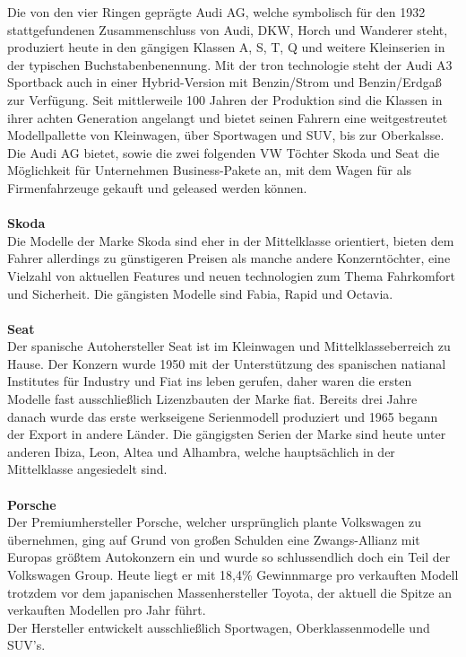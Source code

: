 \documentclass[12pt]{article}
\begin{document}
Die von den vier Ringen geprägte Audi AG, welche symbolisch für den 1932 stattgefundenen Zusammenschluss von
Audi, DKW, Horch und Wanderer steht, produziert heute in den gängigen Klassen A, S, T, Q und weitere Kleinserien in der typischen Buchstabenbenennung. Mit der tron technologie steht der Audi A3 Sportback auch in einer Hybrid-Version mit Benzin/Strom und Benzin/Erdgaß zur Verfügung.
Seit mittlerweile 100 Jahren der Produktion sind die Klassen in ihrer achten Generation angelangt und bietet seinen Fahrern eine weitgestreutet Modellpallette von Kleinwagen, über Sportwagen und SUV, bis zur Oberkalsse. Die Audi AG bietet, sowie die zwei folgenden VW Töchter Skoda und Seat die Möglichkeit für Unternehmen Business-Pakete an, mit dem Wagen für als Firmenfahrzeuge gekauft und geleased werden können.\\
\\
\textbf{Skoda}\\
Die Modelle der Marke Skoda sind eher in der Mittelklasse orientiert, bieten dem Fahrer allerdings zu günstigeren Preisen als manche andere Konzerntöchter, eine Vielzahl von aktuellen Features und neuen technologien zum Thema Fahrkomfort und Sicherheit. Die gängisten Modelle sind Fabia, Rapid und Octavia.\\
\\
\textbf{Seat}\\
Der spanische Autohersteller Seat ist im Kleinwagen und Mittelklasseberreich zu Hause. Der Konzern wurde 1950 mit der Unterstützung des spanischen natianal Institutes für Industry und Fiat ins leben gerufen, daher waren die ersten Modelle fast ausschließlich Lizenzbauten der Marke fiat. Bereits drei Jahre danach wurde das erste werkseigene Serienmodell produziert und 1965 begann der Export in andere Länder.
Die gängigsten Serien der Marke sind heute unter anderen Ibiza, Leon, Altea und Alhambra, welche hauptsächlich in der Mittelklasse angesiedelt sind.\\
\\ 
\textbf{Porsche}\\
Der Premiumhersteller Porsche, welcher ursprünglich plante Volkswagen zu übernehmen, ging auf Grund von großen Schulden eine Zwangs-Allianz mit Europas größtem Autokonzern ein und wurde so schlussendlich doch ein Teil der Volkswagen Group.
Heute liegt er mit 18,4\% Gewinnmarge pro verkauften Modell trotzdem vor dem japanischen Massenhersteller Toyota, der aktuell die Spitze an verkauften Modellen pro Jahr führt.\\
Der Hersteller entwickelt ausschließlich Sportwagen, Oberklassenmodelle und SUV's.
\end{document}
